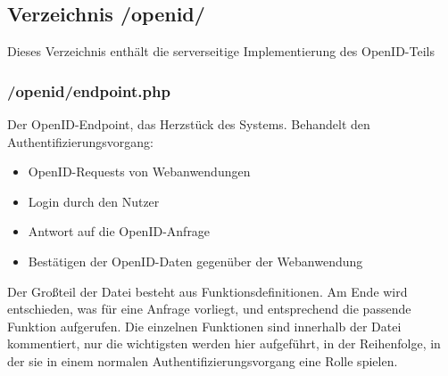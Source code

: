 \subsection{Verzeichnis /openid/}
Dieses Verzeichnis enthält die serverseitige Implementierung des OpenID-Teils

\subsubsection{/openid/endpoint.php}
Der OpenID-Endpoint, das Herzstück des Systems.
Behandelt den Authentifizierungsvorgang:

\begin{itemize}
	\item OpenID-Requests von Webanwendungen
	\item Login durch den Nutzer
	\item Antwort auf die OpenID-Anfrage
	\item Bestätigen der OpenID-Daten gegenüber der Webanwendung
\end{itemize}

Der Großteil der Datei besteht aus Funktionsdefinitionen.
Am Ende wird entschieden, was für eine Anfrage vorliegt, und entsprechend die passende Funktion aufgerufen.
Die einzelnen Funktionen sind innerhalb der Datei kommentiert, nur die wichtigsten werden hier aufgeführt,
in der Reihenfolge, in der sie in einem normalen Authentifizierungsvorgang eine Rolle spielen.

